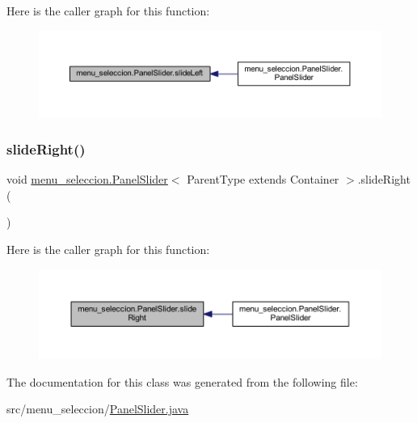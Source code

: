 Here is the caller graph for this function\+:
\nopagebreak
\begin{figure}[H]
\begin{center}
\leavevmode
\includegraphics[width=350pt]{classmenu__seleccion_1_1_panel_slider_a8d9bc3adce84f2fe70cec96343e6bde8_icgraph}
\end{center}
\end{figure}
\mbox{\label{classmenu__seleccion_1_1_panel_slider_a576cb7fd35ba8988ccb55786fd3f3b96}} 
\subsubsection{\texorpdfstring{slide\+Right()}{slideRight()}}
{\footnotesize\ttfamily void \mbox{\hyperlink{classmenu__seleccion_1_1_panel_slider}{menu\+\_\+seleccion.\+Panel\+Slider}}$<$ Parent\+Type extends Container $>$.slide\+Right (\begin{DoxyParamCaption}{ }\end{DoxyParamCaption})}

Here is the caller graph for this function\+:
\nopagebreak
\begin{figure}[H]
\begin{center}
\leavevmode
\includegraphics[width=350pt]{classmenu__seleccion_1_1_panel_slider_a576cb7fd35ba8988ccb55786fd3f3b96_icgraph}
\end{center}
\end{figure}


The documentation for this class was generated from the following file\+:\begin{DoxyCompactItemize}
\item 
src/menu\+\_\+seleccion/\mbox{\hyperlink{_panel_slider_8java}{Panel\+Slider.\+java}}\end{DoxyCompactItemize}
